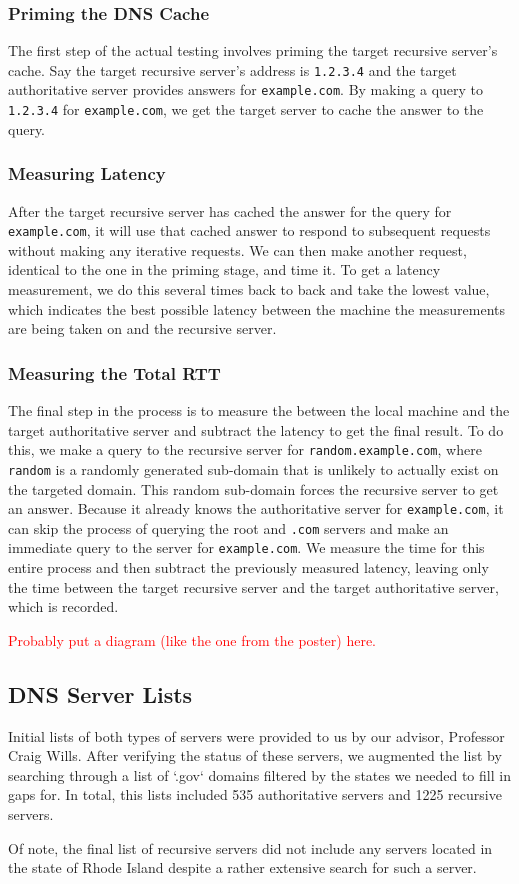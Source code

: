 \subsubsection{Priming the DNS Cache} 
The first step of the actual testing involves priming the target recursive server's cache. Say the target recursive server's \ip address is \texttt{1.2.3.4} and the target authoritative server provides answers for \texttt{example.com}. By making a \dns query to \texttt{1.2.3.4} for \texttt{example.com}, we get the target \dns server to cache the answer to the query.

\subsubsection{Measuring Latency} 
After the target recursive server has cached the answer for the query for \texttt{example.com}, it will use that cached answer to respond to subsequent requests without making any iterative requests. We can then make another request, identical to the one in the priming stage, and time it. To get a latency measurement, we do this several times back to back and take the lowest value, which indicates the best possible latency between the machine the measurements are being taken on and the recursive server.

\subsubsection{Measuring the Total RTT} 
The final step in the process is to measure the \rtt between the local machine and the target authoritative server and subtract the latency to get the final result. To do this, we make a query to the recursive server for \texttt{random.example.com}, where \texttt{random} is a randomly generated sub-domain that is unlikely to actually exist on the targeted domain. This random sub-domain forces the recursive server to get an answer. Because it already knows the authoritative server for \texttt{example.com}, it can skip the process of querying the root and \texttt{.com} servers and make an immediate query to the server for \texttt{example.com}. We measure the time for this entire process and then subtract the previously measured latency, leaving only the time between the target recursive server and the target authoritative server, which is recorded.
    
\textcolor{red}{Probably put a diagram (like the one from the poster) here.}

\subsection{DNS Server Lists}

Initial lists of both types of \dns servers were provided to us by our advisor, Professor Craig Wills. After verifying the status of these servers, we augmented the list by searching through a list of `.gov` domains filtered by the states we needed to fill in gaps for. In total, this lists included 535 authoritative servers and 1225 recursive servers.

Of note, the final list of recursive servers did not include any servers located in the state of Rhode Island despite a rather extensive search for such a server.